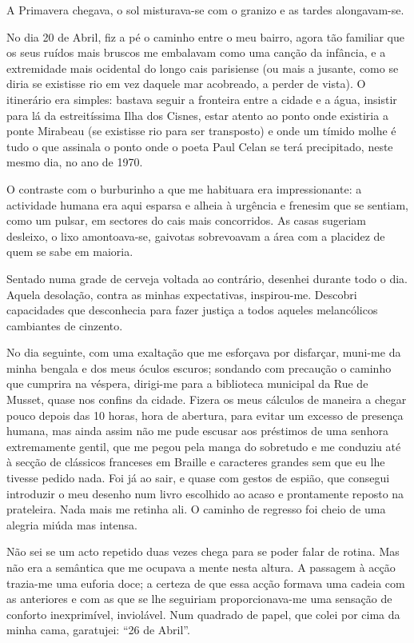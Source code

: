 A Primavera chegava, o sol misturava-se com o granizo e as tardes
alongavam-se.

No dia 20 de Abril, fiz a pé o caminho entre o meu bairro, agora tão
familiar que os seus ruídos mais bruscos me embalavam como uma canção
da infância, e a extremidade mais ocidental do longo cais parisiense (ou
mais a jusante, como se diria se existisse rio em vez daquele mar
acobreado, a perder de vista). O itinerário era simples: bastava seguir
a fronteira entre a cidade e a água, insistir para lá da estreitíssima
Ilha dos Cisnes, estar atento ao ponto onde existiria a ponte Mirabeau
(se existisse rio para ser transposto) e onde um tímido molhe é tudo o
que assinala o ponto onde o poeta Paul Celan se terá precipitado, neste
mesmo dia, no ano de 1970.

O contraste com o burburinho a que me habituara era
impressionante: a actividade humana era aqui esparsa e alheia à urgência
e frenesim que se sentiam, como um pulsar, em sectores do cais mais
concorridos. As casas sugeriam desleixo, o lixo amontoava-se, gaivotas
sobrevoavam a área com a placidez de quem se sabe em maioria.

Sentado numa grade de cerveja voltada ao contrário, desenhei durante
todo o dia. Aquela desolação, contra as minhas expectativas,
inspirou-me. Descobri capacidades que desconhecia para fazer justiça a
todos aqueles melancólicos cambiantes de cinzento.

No dia seguinte, com uma exaltação que me esforçava por disfarçar,
muni-me da minha bengala e dos meus óculos escuros; sondando com
precaução o caminho que cumprira na véspera, dirigi-me para a biblioteca
municipal da Rue de Musset, quase nos confins da cidade. Fizera os meus
cálculos de maneira a chegar pouco depois das 10 horas, hora de abertura, para evitar um excesso de presença humana, mas ainda assim não me
pude escusar aos préstimos de uma senhora extremamente gentil, que me
pegou pela manga do sobretudo e me conduziu até à secção de clássicos
franceses em Braille e caracteres grandes sem que eu lhe tivesse pedido
nada. Foi já ao sair, e quase com gestos de espião, que consegui
introduzir o meu desenho num livro escolhido ao acaso e prontamente
reposto na prateleira. Nada mais me retinha ali. O caminho de regresso
foi cheio de uma alegria miúda mas intensa.

Não sei se um acto repetido duas vezes chega para se poder falar de
rotina. Mas não era a semântica que me ocupava a mente nesta altura. A
passagem à acção trazia-me uma euforia doce; a certeza de que essa acção
formava uma cadeia com as anteriores e com as que se lhe seguiriam
proporcionava-me uma sensação de conforto inexprimível, inviolável. Num
quadrado de papel, que colei por cima da minha cama, garatujei: ``26
de Abril''.

